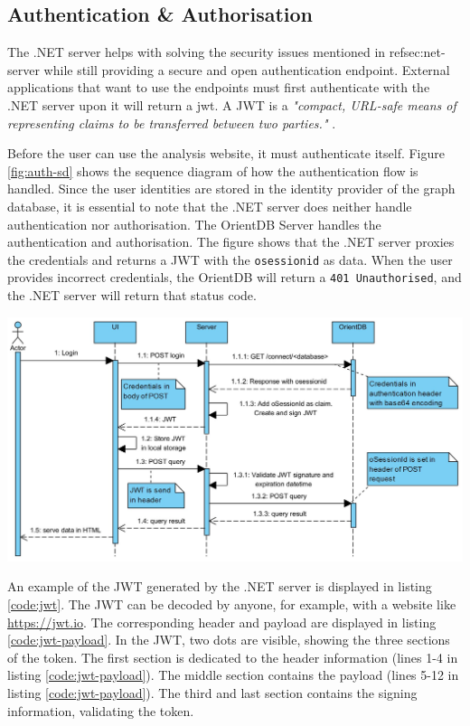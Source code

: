 \subsection{Authentication \& Authorisation} \label{sec:auth}
The .NET server helps with solving the security issues mentioned in ref{sec:net-server}  while still providing a secure and open authentication endpoint. External applications that want to use the endpoints must first authenticate with the .NET server upon it will return a \acrfull{jwt}. A JWT is a \textit{"compact, URL-safe means of representing claims to be transferred between two parties."} \cite{jones2015json}.

Before the user can use the \testar analysis website, it must authenticate itself. Figure \ref{fig:auth-sd} shows the sequence diagram of how the authentication flow is handled. Since the user identities are stored in the identity provider of the graph database, it is essential to note that the .NET server does neither handle authentication nor authorisation. The OrientDB Server handles the authentication and authorisation. The figure shows that the .NET server proxies the credentials and returns a JWT with the \verb|osessionid| as data. When the user provides incorrect credentials, the OrientDB will return a \verb|401 Unauthorised|, and the .NET server will return that status code.

\begingroup
\captionsetup{type=figure}
\includegraphics[scale=0.4]{thesis/images/authentication-sd.png}
\label{fig:auth-sd}
\endgroup

An example of the JWT generated by the .NET server is displayed in listing \ref{code:jwt}. The JWT can be decoded by anyone, for example, with a website like \url{https://jwt.io}. The corresponding header and payload are displayed in listing \ref{code:jwt-payload}. In the JWT, two dots are visible, showing the three sections of the token. The first section is dedicated to the header information (lines 1-4 in listing \ref{code:jwt-payload}). The middle section contains the payload (lines 5-12 in listing \ref{code:jwt-payload}). The third and last section contains the signing information, validating the token. 


